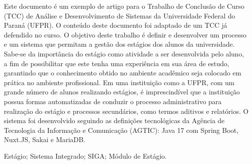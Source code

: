 \documentclass[conference,a4paper,10pt]{IEEETran}
\begin{document}
\begin{resumo}
Este documento é um exemplo de artigo para o Trabalho de Conclusão de Curso (TCC) de Análise e Desenvolvimento de Sistemas da Universidade Federal do Paraná (UFPR). O conteúdo deste documento foi adaptado de um TCC já defendido no curso. O objetivo deste trabalho é definir e desenvolver um processo e um sistema que permitam a gestão dos estágios dos alunos da universidade. Sabe-se da importância do estágio  como atividade a ser desenvolvida pelo aluno, a fim de possibilitar que este tenha uma experiência em sua
área de estudo, garantindo que o conhecimento obtido no ambiente acadêmico seja colocado em prática no ambiente profissional. Em uma instituição como a UFPR, com um grande número de alunos realizando estágios, é imprescindível que a instituição possua formas automatizadas de conduzir o processo administrativo para realização do estágio e processos secundários, como termos aditivos e relatórios. O sistema foi desenvolvido seguindo as definições tecnológicas da Agência de Tecnologia da Informação e Comunicação (AGTIC): Java 17 com Spring Boot, Nuxt.JS, Sakai e MariaDB.
\end{resumo}

\begin{palavraschave}
Estágio; Sistema Integrado; SIGA; Módulo de Estágio.
\end{palavraschave}

\begin{abstract}
This document is an example of a final paper (Trabalho de Conclusão de Curso – TCC) for the Systems Analysis and Development course at the Federal University of Paraná (UFPR). The content of this document was adapted from a TCC already defended in the course. The objective of this work is to define and develop a process and a system that enable the management of student internships at the university. The internship is known to be an essential activity for students, as it provides practical experience in their field of study, ensuring that the knowledge acquired in the academic environment is applied in the professional setting. At an institution such as UFPR, with a large number of students undertaking internships, it is crucial to have automated means to conduct the administrative process of managing internships, as well as related procedures such as amendments and reports. The system was developed in accordance with the technological guidelines of the Information and Communication Technology Agency (AGTIC), using Java 17 with Spring Boot, Nuxt.JS, Sakai, and MariaDB.
\end{abstract}
\end{document}
